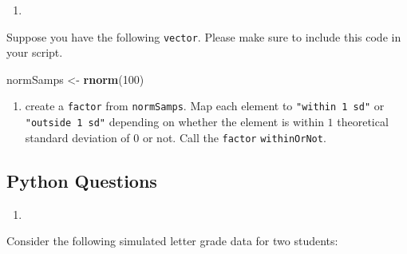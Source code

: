 \documentclass[12pt,krantz2]{krantz}
\makeatletter
\newenvironment{Shaded}{\begin{snugshade}}{\end{snugshade}}
\newcommand{\DecValTok}[1]{\textcolor[rgb]{0.06,0.06,0.06}{#1}}
\newcommand{\KeywordTok}[1]{\textcolor[rgb]{0.27,0.27,0.27}{\textbf{#1}}}
\newcommand{\NormalTok}[1]{#1}
\newcommand{\StringTok}[1]{\textcolor[rgb]{0.5,0.5,0.5}{#1}}
\providecommand{\tightlist}{%
  \setlength{\itemsep}{0pt}\setlength{\parskip}{0pt}}
\newenvironment{kframe}{%
\medskip{}
\setlength{\fboxsep}{.8em}
 \def\at@end@of@kframe{}%
 \ifinner\ifhmode%
  \def\at@end@of@kframe{\end{minipage}}%
  \begin{minipage}{\columnwidth}%
 \fi\fi%
 \def\FrameCommand##1{\hskip\@totalleftmargin \hskip-\fboxsep
 \colorbox{shadecolor}{##1}\hskip-\fboxsep
     \hskip-\linewidth \hskip-\@totalleftmargin \hskip\columnwidth}%
 \MakeFramed {\advance\hsize-\width
   \@totalleftmargin\z@ \linewidth\hsize
   \@setminipage}}%
 {\par\unskip\endMakeFramed%
 \at@end@of@kframe}
\renewenvironment{Shaded}{\begin{kframe}}{\end{kframe}}
\makeatother
\begin{document}
\begin{enumerate}
\def\labelenumi{\arabic{enumi}.}
\setcounter{enumi}{1}
\item
\end{enumerate}

Suppose you have the following \texttt{vector}. Please make sure to include this code in your script.

\begin{Shaded}
\begin{Highlighting}[]
\NormalTok{normSamps <-}\StringTok{ }\KeywordTok{rnorm}\NormalTok{(}\DecValTok{100}\NormalTok{)}
\end{Highlighting}
\end{Shaded}

\begin{enumerate}
\def\labelenumi{\alph{enumi})}
\tightlist
\item
  create a \texttt{factor} from \texttt{normSamps}. Map each element to \texttt{"within\ 1\ sd"} or \texttt{"outside\ 1\ sd"} depending on whether the element is within \(1\) theoretical standard deviation of \(0\) or not. Call the \texttt{factor} \texttt{withinOrNot}.
\end{enumerate}

\hypertarget{python-questions-5}{%
\subsection{Python Questions}\label{python-questions-5}}

\begin{enumerate}
\def\labelenumi{\arabic{enumi}.}
\item
\end{enumerate}

Consider the following simulated letter grade data for two students:
\end{document}
